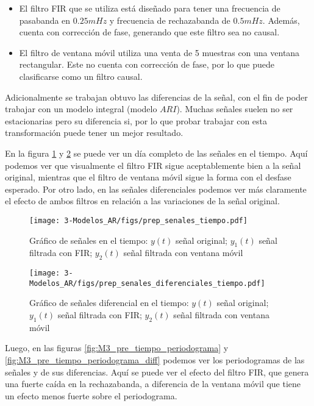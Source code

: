 \begin{itemize}
	
\item El filtro FIR que se utiliza está diseñado para tener una frecuencia de pasabanda en $0.25 mHz$ y frecuencia de rechazabanda de $0.5 mHz$. Además, cuenta con corrección de fase, generando que este filtro sea no causal.

\item El filtro de ventana móvil utiliza una venta de 5 muestras con una ventana rectangular. Este no cuenta con corrección de fase, por lo que puede clasificarse como un filtro causal.

\end{itemize}

Adicionalmente se trabajan obtuvo las diferencias de la señal, con el fin de poder trabajar con un modelo integral (modelo $ARI$). Muchas señales suelen no ser estacionarias pero su diferencia si, por lo que probar trabajar con esta transformación puede tener un mejor resultado.

En la figura \ref{fig:M3_pre_tiempo} y \ref{fig:M3_pre_tiempo_diff} se puede ver un día completo de las señales en el tiempo. Aquí podemos ver que visualmente el filtro FIR sigue aceptablemente bien a la señal original, mientras que el filtro de ventana móvil sigue la forma con el desfase esperado. Por otro lado, en las señales diferenciales podemos ver más claramente el efecto de ambos filtros en relación a las variaciones de la señal original.


\begin{figure}[H]
	\centering
	\texttt{[image: 3-Modelos\_AR/figs/prep\_senales\_tiempo.pdf]}
	\caption{Gráfico de señales en el tiempo: $y(t)$ señal original; $y_1(t)$ señal filtrada con FIR; $y_2(t)$ señal filtrada con ventana móvil}
	\label{fig:M3_pre_tiempo}
\end{figure}


\begin{figure}[H]
	\centering
	\texttt{[image: 3-Modelos\_AR/figs/prep\_senales\_diferenciales\_tiempo.pdf]}
	\caption{Gráfico de señales diferencial en el tiempo: $y(t)$ señal original; $y_1(t)$ señal filtrada con FIR; $y_2(t)$ señal filtrada con ventana móvil}
	\label{fig:M3_pre_tiempo_diff}
\end{figure}


Luego, en las figuras \ref{fig:M3_pre_tiempo_periodograma} y \ref{fig:M3_pre_tiempo_periodograma_diff} podemos ver los periodogramas de las señales y de sus diferencias. Aquí se puede ver el efecto del filtro FIR, que genera una fuerte caída en la rechazabanda, a diferencia de la ventana móvil que tiene un efecto menos fuerte sobre el periodograma.

